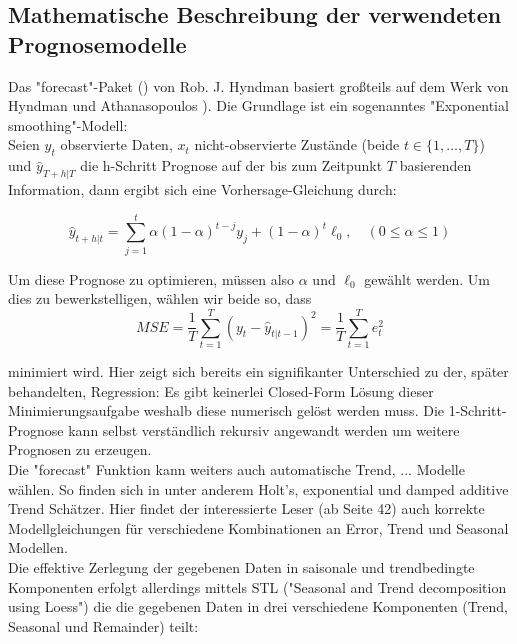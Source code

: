 \documentclass[a4paper,11pt]{article}
\begin{document}
\subsection{Mathematische Beschreibung der verwendeten Prognosemodelle}

Das "forecast"-Paket (\cite{forecast}) von Rob. J. Hyndman basiert großteils auf dem Werk von Hyndman und Athanasopoulos \cite{hyndman2018forecasting}). Die Grundlage ist ein sogenanntes "Exponential smoothing"-Modell:\\

Seien $y_t$ observierte Daten, $x_t$ nicht-observierte Zustände (beide $t \in \{1,\dots,T\}$) und $\hat{y}_{T+h|T}$ die h-Schritt Prognose auf der bis zum Zeitpunkt $T$ basierenden Information, dann ergibt sich eine Vorhersage-Gleichung durch:

\begin{equation} 
	\hat{y}_{t+h|t}=\sum_{j=1}^{t} \alpha(1-\alpha)^{t-j} y_{j}+(1-\alpha)^{t} \ell_{0}, \quad(0 \leq \alpha \leq 1)
\end{equation}

Um diese Prognose zu optimieren, müssen also $\alpha$ und $\ell_0$ gewählt werden. Um dies zu bewerkstelligen, wählen wir beide so, dass 
\begin{equation} 
	MSE=\frac{1}{T} \sum_{t=1}^{T}\left(y_{t}-\hat{y}_{t|t-1}\right)^{2}=\frac{1}{T} \sum_{t=1}^{T} e_{t}^{2}
\end{equation}

minimiert wird. Hier zeigt sich bereits ein signifikanter Unterschied zu der, später behandelten, Regression: Es gibt keinerlei Closed-Form Lösung dieser Minimierungsaufgabe weshalb diese numerisch gelöst werden muss. Die 1-Schritt-Prognose kann selbst verständlich rekursiv angewandt werden um weitere Prognosen zu erzeugen.\\

Die "forecast" Funktion kann weiters auch automatische Trend, ... Modelle wählen. So finden sich in \cite{hyndman2018forecasting} unter anderem Holt's, exponential und damped additive Trend Schätzer. Hier findet der interessierte Leser (ab Seite 42) auch korrekte Modellgleichungen für verschiedene Kombinationen an Error, Trend und Seasonal Modellen. \\

Die effektive Zerlegung der gegebenen Daten in saisonale und trendbedingte Komponenten erfolgt allerdings mittels STL  ("Seasonal and Trend decomposition using Loess") \cite{cleveland1990stl} die die gegebenen Daten in drei verschiedene Komponenten (Trend, Seasonal und Remainder) teilt:
\end{document}
